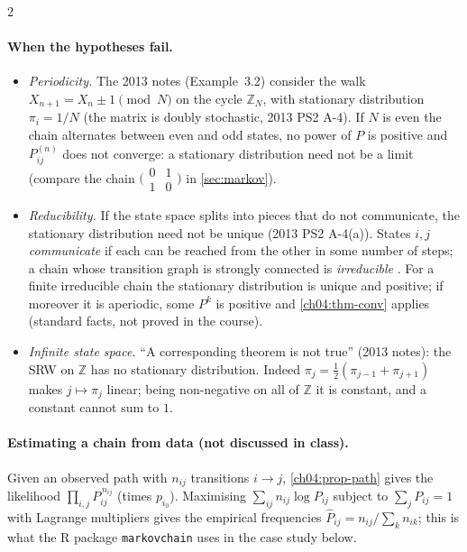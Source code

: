 \begin{paracol}{2}
\paragraph{When the hypotheses fail.}
\begin{itemize}
  \item \emph{Periodicity.} The 2013 notes (Example~3.2) consider the walk $X_{n+1}=X_n\pm1\pmod N$ on the
        cycle $\mathbb Z_N$, with stationary distribution $\pi_i=1/N$ (the matrix is doubly stochastic, 2013 PS2
        A-4). If $N$ is even the chain alternates between even and odd states, no power of $P$ is positive and
        $P^{(n)}_{ij}$ does not converge: a stationary distribution need not be a limit (compare the chain
        $\bigl(\begin{smallmatrix}0&1\\1&0\end{smallmatrix}\bigr)$ in \cref{sec:markov}).
  \item \emph{Reducibility.} If the state space splits into pieces that do not communicate, the stationary
        distribution need not be unique (2013 PS2 A-4(a)). States $i,j$ \emph{communicate} if each can be
        reached from the other in some number of steps; a chain whose transition graph is strongly connected
        is \emph{irreducible} . For a finite irreducible chain the stationary distribution is
        unique and positive; if moreover it is aperiodic, some $P^k$ is positive and \cref{ch04:thm-conv}
        applies (standard facts, not proved in the course).
  \item \emph{Infinite state space.} ``A corresponding theorem is not true'' (2013 notes): the SRW on $\mathbb Z$
        has no stationary distribution. Indeed $\pi_j=\tfrac12(\pi_{j-1}+\pi_{j+1})$ makes $j\mapsto\pi_j$ linear;
        being non-negative on all of $\mathbb Z$ it is constant, and a constant cannot sum to $1$.
\end{itemize}

\paragraph{Estimating a chain from data (not discussed in class).} Given an observed path with $n_{ij}$
transitions $i\to j$, \cref{ch04:prop-path} gives the likelihood $\prod_{i,j}P_{ij}^{\,n_{ij}}$ (times
$p_{i_0}$). Maximising $\sum_{ij}n_{ij}\log P_{ij}$ subject to $\sum_jP_{ij}=1$ with Lagrange multipliers gives
the empirical frequencies $\hat P_{ij}=n_{ij}/\sum_kn_{ik}$; this is what the R package \texttt{markovchain}
uses in the case study below.


\end{paracol}
